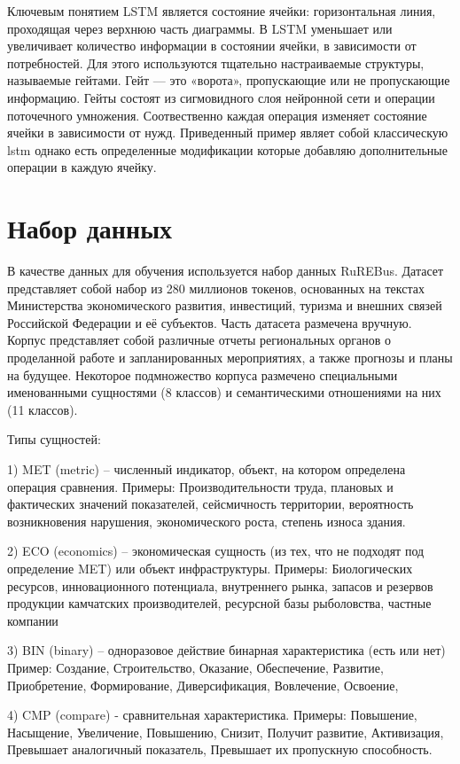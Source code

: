 \documentclass{article}
\begin{document}
Ключевым понятием LSTM является состояние ячейки: горизонтальная линия, проходящая через верхнюю часть диаграммы. В LSTM уменьшает или увеличивает количество информации в состоянии ячейки, в зависимости от потребностей. Для этого используются тщательно настраиваемые структуры, называемые гейтами. Гейт — это «ворота», пропускающие или не пропускающие информацию. Гейты состоят из сигмовидного слоя нейронной сети и операции поточечного умножения. Соотвественно каждая операция изменяет состояние ячейки в зависимости от нужд. Приведенный пример являет собой классическую lstm однако есть определенные модификации которые добавляю дополнительные операции в каждую ячейку.

\section{Набор данных}
В качестве данных для обучения используется набор данных RuREBus. Датасет представляет собой набор из 280 миллионов токенов, основанных на текстах Министерства экономического развития, инвестиций, туризма и внешних связей Российской Федерации и её субъектов. Часть датасета размечена вручную. Корпус представляет собой различные отчеты региональных органов о проделанной работе и запланированных мероприятиях, а также прогнозы и планы на будущее. Некоторое подмножество корпуса размечено специальными именованными сущностями (8 классов) и семантическими отношениями на них (11 классов).

Типы сущностей: 

1) MET (metric) – численный индикатор, объект, на котором определена операция сравнения. 
Примеры: Производительности труда, плановых и фактических значений показателей, сейсмичность территории, вероятность возникновения нарушения, экономического роста, степень износа здания.

2) ECO (economics) – экономическая сущность (из тех, что не подходят под определение MET) или объект инфраструктуры. 
Примеры: Биологических ресурсов, инновационного потенциала, внутреннего рынка, запасов и резервов продукции камчатских производителей, ресурсной базы рыболовства, частные компании
 
3) BIN (binary) – одноразовое действие бинарная характеристика (есть или нет) 
Пример: Создание, Строительство, Оказание, Обеспечение, Развитие, Приобретение, Формирование, Диверсификация, Вовлечение, Освоение, 

4) CMP (compare) - сравнительная характеристика. 
Примеры: Повышение, Насыщение, Увеличение, Повышению, Снизит, Получит развитие, Активизация, Превышает аналогичный показатель, Превышает их пропускную способность. 
\end{document}
